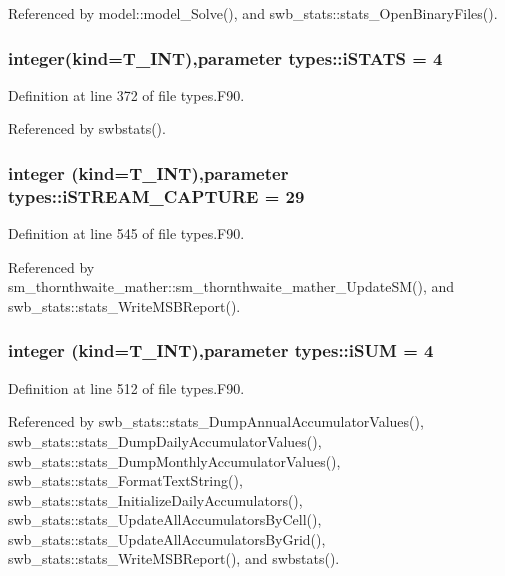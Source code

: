 Referenced by model::model\_\-Solve(), and swb\_\-stats::stats\_\-OpenBinaryFiles().

\hypertarget{namespacetypes_af7f37d0a4b61a411aa5759a66973dc62}{
\subsubsection[{iSTATS}]{\setlength{\rightskip}{0pt plus 5cm}integer(kind={\bf T\_\-INT}),parameter {\bf types::iSTATS} = 4}}
\label{namespacetypes_af7f37d0a4b61a411aa5759a66973dc62}


Definition at line 372 of file types.F90.



Referenced by swbstats().

\hypertarget{namespacetypes_a15ee2167fce4158f95e9d9846fda5ad5}{
\subsubsection[{iSTREAM\_\-CAPTURE}]{\setlength{\rightskip}{0pt plus 5cm}integer (kind={\bf T\_\-INT}),parameter {\bf types::iSTREAM\_\-CAPTURE} = 29}}
\label{namespacetypes_a15ee2167fce4158f95e9d9846fda5ad5}


Definition at line 545 of file types.F90.



Referenced by sm\_\-thornthwaite\_\-mather::sm\_\-thornthwaite\_\-mather\_\-UpdateSM(), and swb\_\-stats::stats\_\-WriteMSBReport().

\hypertarget{namespacetypes_a0b92a69a1b38cb0319dfe59e72f8a7fc}{
\subsubsection[{iSUM}]{\setlength{\rightskip}{0pt plus 5cm}integer (kind={\bf T\_\-INT}),parameter {\bf types::iSUM} = 4}}
\label{namespacetypes_a0b92a69a1b38cb0319dfe59e72f8a7fc}


Definition at line 512 of file types.F90.



Referenced by swb\_\-stats::stats\_\-DumpAnnualAccumulatorValues(), swb\_\-stats::stats\_\-DumpDailyAccumulatorValues(), swb\_\-stats::stats\_\-DumpMonthlyAccumulatorValues(), swb\_\-stats::stats\_\-FormatTextString(), swb\_\-stats::stats\_\-InitializeDailyAccumulators(), swb\_\-stats::stats\_\-UpdateAllAccumulatorsByCell(), swb\_\-stats::stats\_\-UpdateAllAccumulatorsByGrid(), swb\_\-stats::stats\_\-WriteMSBReport(), and swbstats().

